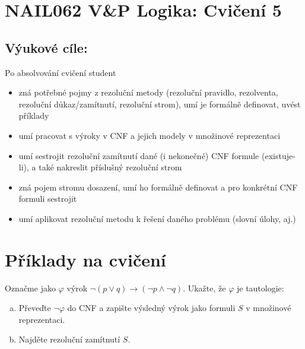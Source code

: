 \documentclass[a4paper,11pt]{amsart}
\begin{document}
\section*{NAIL062 V\&P Logika: Cvičení 5}


\subsection*{Výukové cíle:} Po absolvování cvičení student

    \begin{itemize}\setlength{\itemsep}{0pt}
        \item zná potřebné pojmy z rezoluční metody (rezoluční pravidlo, rezolventa, rezoluční důkaz/zamítnutí, rezoluční strom), umí je formálně definovat, uvést příklady
        \item umí pracovat s výroky v CNF a jejich modely v množinové reprezentaci
        \item umí sestrojit rezoluční zamítnutí dané (i nekonečné) CNF formule (existuje-li), a také nakreslit příslušný rezoluční strom
        \item zná pojem stromu dosazení, umí ho formálně definovat a pro konkrétní CNF formuli sestrojit
        \item umí aplikovat rezoluční metodu k řešení daného problému (slovní úlohy, aj.)
    \end{itemize}
    

\section*{Příklady na cvičení}


\begin{problem}

    Označme jako $\varphi$ výrok $\neg (p \vee q) \to (\neg p \wedge \neg q)$. Ukažte, že $\varphi$ je tautologie:
    \begin{enumerate}[(a)]
        \item Převeďte $\neg \varphi$ do CNF a zapište výsledný výrok jako formuli $S$ v množinové reprezentaci.
        \item Najděte rezoluční zamítnutí $S$.
    \end{enumerate}

    \begin{solution}
                    
    \end{solution}

\end{problem}
\end{document}
